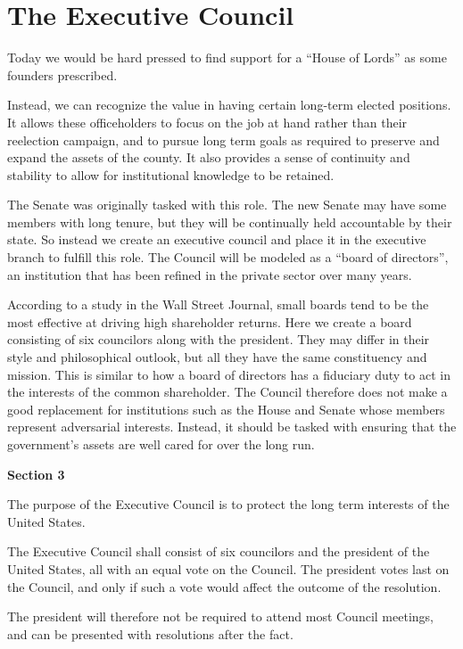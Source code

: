 \documentclass{article}
\newcommand{\quotes}[1]{``#1''}
\begin{document}
\section{The Executive Council}

Today we would be hard pressed to find support for a \quotes{House of Lords} as some founders prescribed.

Instead, we can recognize the value in having certain long-term elected positions. It allows these officeholders to focus on the job at hand rather than their reelection campaign, and to pursue long term goals as required to preserve and expand the assets of the county. It also provides a sense of continuity and stability to allow for institutional knowledge to be retained.

The Senate was originally tasked with this role. The new Senate may have some members with long tenure, but they will be continually held accountable by their state. So instead we create an executive council and place it in the executive branch to fulfill this role. The Council will be modeled as a \quotes{board of directors}, an institution that has been refined in the private sector over many years.

According to a study in the Wall Street Journal, small boards tend to be the most effective at driving high shareholder returns\cite{Lublin}. Here we create a board consisting of six councilors along with the president. They may differ in their style and philosophical outlook, but all they have the same constituency and mission. This is similar to how a board of directors has a fiduciary duty to act in the interests of the common shareholder. The Council therefore does not make a good replacement for institutions such as the House and Senate whose members represent adversarial interests. Instead, it should be tasked with ensuring that the government's assets are well cared for over the long run.

\begin{quoting}
\textbf{Section 3}

The purpose of the Executive Council is to protect the long term interests of the United States.

The Executive Council shall consist of six councilors and the president of the United States, all with an equal vote on the Council. The president votes last on the Council, and only if such a vote would affect the outcome of the resolution.
\end{quoting}

The president will therefore not be required to attend most Council meetings, and can be presented with resolutions after the fact.
\end{document}
